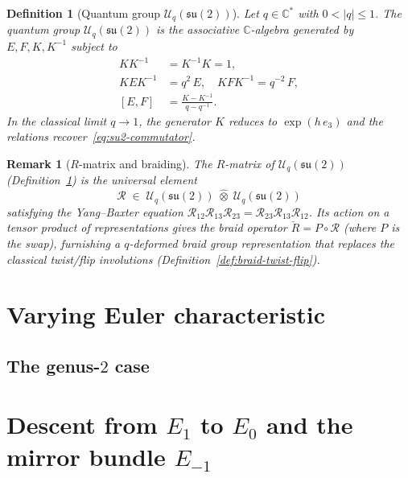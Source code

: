 \documentclass[12pt,a4paper]{report}
\newtheorem{definition}[theorem]{Definition}
\newtheorem{remark}[theorem]{Remark}
\begin{document}
\begin{definition}[Quantum group $\mathcal{U}_q(\mathfrak{su}(2))$]
\label{def:quantum-su2}
Let $q\in\mathbb{C}^{*}$ with $0<\lvert q\rvert\le 1$.  The
\emph{quantum group} $\mathcal{U}_q(\mathfrak{su}(2))$ is the
associative $\mathbb{C}$-algebra generated by $E,F,K,K^{-1}$ subject to
\begin{align}
  KK^{-1}&=K^{-1}K=1,
    \label{eq:quantum-KK}\\[3pt]
  KEK^{-1}&=q^2\,E,\quad KFK^{-1}=q^{-2}\,F,
    \label{eq:quantum-KE}\\[3pt]
  [E,F]&=\frac{K-K^{-1}}{q-q^{-1}}.
    \label{eq:quantum-EF}
\end{align}
In the classical limit $q\to 1$, the generator $K$ reduces to
$\exp(h\,e_3)$ and the relations recover~\eqref{eq:su2-commutator}.
\end{definition}

\begin{remark}[$R$-matrix and braiding]
\label{rem:r-matrix-braiding}
The $R$-matrix of $\mathcal{U}_q(\mathfrak{su}(2))$
(Definition~\ref{def:quantum-su2}) is the universal element
\[
  \mathcal{R}\;\in\;
  \mathcal{U}_q(\mathfrak{su}(2))\;\hat{\otimes}\;
  \mathcal{U}_q(\mathfrak{su}(2))
\]
satisfying the Yang--Baxter equation
$\mathcal{R}_{12}\mathcal{R}_{13}\mathcal{R}_{23}
=\mathcal{R}_{23}\mathcal{R}_{13}\mathcal{R}_{12}$.
Its action on a tensor product of representations gives the braid
operator $\check{R}=P\circ\mathcal{R}$ (where $P$ is the swap),
furnishing a $q$-deformed braid group representation that replaces
the classical twist/flip involutions
(Definition~\ref{def:braid-twist-flip}).
\end{remark}



\section{Varying Euler characteristic}
\label{sec:varying-euler}





\subsection{The genus-$2$ case}
\label{subsec:genus-2}





\section{Descent from $E_1$ to $E_0$ and the mirror bundle $E_{-1}$}
\label{sec:descent-mirror}
\end{document}
